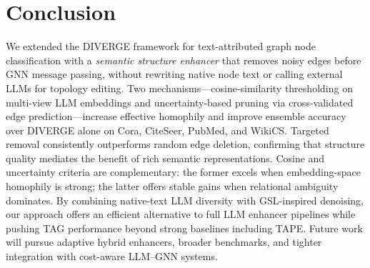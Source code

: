 \documentclass{article}
\begin{document}
\section{Conclusion}
\label{sec:conclusion}

We extended the DIVERGE framework for text-attributed graph node classification with a
\emph{semantic structure enhancer} that removes noisy edges before GNN message passing,
without rewriting native node text or calling external LLMs for topology editing. Two
mechanisms---cosine-similarity thresholding on multi-view LLM embeddings and
uncertainty-based pruning via cross-validated edge prediction---increase effective
homophily and improve ensemble accuracy over DIVERGE alone on Cora, CiteSeer, PubMed,
and WikiCS. Targeted removal consistently outperforms random edge deletion, confirming
that structure quality mediates the benefit of rich semantic representations. Cosine and
uncertainty criteria are complementary: the former excels when embedding-space homophily
is strong; the latter offers stable gains when relational ambiguity dominates. By
combining native-text LLM diversity with GSL-inspired denoising, our approach offers an
efficient alternative to full LLM enhancer pipelines while pushing TAG performance
beyond strong baselines including TAPE. Future work will pursue adaptive hybrid
enhancers, broader benchmarks, and tighter integration with cost-aware LLM--GNN systems.




\end{document}
